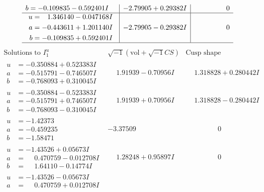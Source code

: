 \documentclass[1p]{elsarticle_modified}
\theoremstyle{definition}
\newcommand{\I}{\sqrt{-1}}
\begin{document}
$$\begin{array}{c|c|c}
\begin{aligned}
b &= -0.109835 - 0.592401 I\end{aligned}
 & -2.79905 + 0.29382 I & \phantom{-0.000000 } 0 \\ \hline\begin{aligned}
u &= \phantom{-}1.346140 - 0.047168 I \\
a &= -0.443611 + 1.201140 I \\
b &= -0.109835 + 0.592401 I\end{aligned}
 & -2.79905 - 0.29382 I & \phantom{-0.000000 } 0\\
 \hline 
 \end{array}$$\newpage$$\begin{array}{c|c|c}  
\text{Solutions to }I^u_{1}& \I (\text{vol} + \sqrt{-1}CS) & \text{Cusp shape}\\
 \hline 
\begin{aligned}
u &= -0.350884 + 0.523383 I \\
a &= -0.515791 - 0.746507 I \\
b &= -0.768093 + 0.310045 I\end{aligned}
 & \phantom{-}1.91939 - 0.70956 I & \phantom{-}1.318828 + 0.280442 I \\ \hline\begin{aligned}
u &= -0.350884 - 0.523383 I \\
a &= -0.515791 + 0.746507 I \\
b &= -0.768093 - 0.310045 I\end{aligned}
 & \phantom{-}1.91939 + 0.70956 I & \phantom{-}1.318828 - 0.280442 I \\ \hline\begin{aligned}
u &= -1.42373\phantom{ +0.000000I} \\
a &= -0.459235\phantom{ +0.000000I} \\
b &= -1.58471\phantom{ +0.000000I}\end{aligned}
 & -3.37509\phantom{ +0.000000I} & \phantom{-0.000000 } 0 \\ \hline\begin{aligned}
u &= -1.43526 + 0.05673 I \\
a &= \phantom{-}0.470759 - 0.012708 I \\
b &= \phantom{-}1.64110 - 0.14774 I\end{aligned}
 & \phantom{-}1.28248 + 0.95897 I & \phantom{-0.000000 } 0 \\ \hline\begin{aligned}
u &= -1.43526 - 0.05673 I \\
a &= \phantom{-}0.470759 + 0.012708 I \\

\end{aligned}
\end{array}$$
\end{document}
